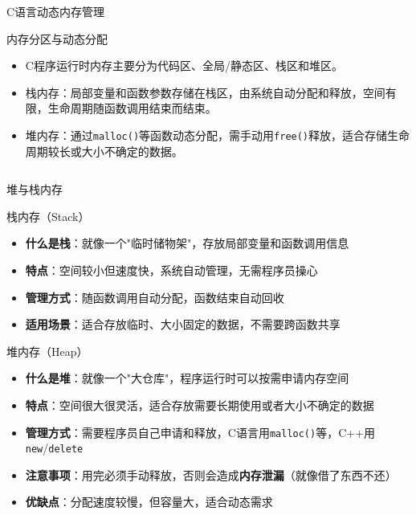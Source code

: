 \documentclass[UTF8,aspectratio=169]{beamer}
\begin{document}
\begin{frame}{C语言动态内存管理}
    \begin{ytublock}{内存分区与动态分配}
        \begin{itemize}
            \item C程序运行时内存主要分为代码区、全局/静态区、栈区和堆区。
            \item 栈内存：局部变量和函数参数存储在栈区，由系统自动分配和释放，空间有限，生命周期随函数调用结束而结束。
            \item 堆内存：通过\texttt{malloc()}等函数动态分配，需手动用\texttt{free()}释放，适合存储生命周期较长或大小不确定的数据。
        \end{itemize}
        \inputminted[firstline=8,lastline=12]{cpp}{code/c_pointer_memory_example.c}
    \end{ytublock}
\end{frame}

\begin{frame}{堆与栈内存}
    \begin{ytublock}{栈内存（Stack）}
        \begin{itemize}
            \item \textbf{什么是栈}：就像一个"临时储物架"，存放局部变量和函数调用信息
            \item \textbf{特点}：空间较小但速度快，系统自动管理，无需程序员操心
            \item \textbf{管理方式}：随函数调用自动分配，函数结束自动回收
            \item \textbf{适用场景}：适合存放临时、大小固定的数据，不需要跨函数共享
        \end{itemize}
    \end{ytublock}
    \begin{ytublock}{堆内存（Heap）}
        \begin{itemize}
            \item \textbf{什么是堆}：就像一个"大仓库"，程序运行时可以按需申请内存空间
            \item \textbf{特点}：空间很大很灵活，适合存放需要长期使用或者大小不确定的数据
            \item \textbf{管理方式}：需要程序员自己申请和释放，C语言用\texttt{malloc()}等，C++用\texttt{new}/\texttt{delete}
            \item \textbf{注意事项}：用完必须手动释放，否则会造成\textbf{内存泄漏}（就像借了东西不还）
            \item \textbf{优缺点}：分配速度较慢，但容量大，适合动态需求
        \end{itemize}
    \end{ytublock}
\end{frame}
\end{document}
